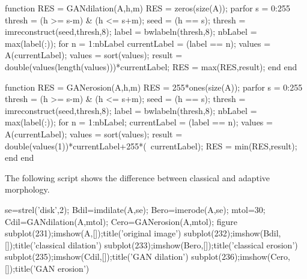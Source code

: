 \begin{matlab}
function RES = GANdilation(A,h,m)
RES = zeros(size(A));
parfor s = 0:255
    thresh = (h >= s-m) & (h <= s+m);
    seed = (h == s);
    thresh = imreconstruct(seed,thresh,8);
    label = bwlabeln(thresh,8);
    nbLabel = max(label(:));
    for n = 1:nbLabel
        currentLabel = (label == n);
        values = A(currentLabel);
        values = sort(values);
        result = double(values(length(values)))*currentLabel;
        RES = max(RES,result);  
    end
end
\end{matlab}

\begin{matlab}
function RES = GANerosion(A,h,m)
RES = 255*ones(size(A));
parfor s = 0:255
    thresh = (h >= s-m) & (h <= s+m);
    seed = (h == s);
    thresh = imreconstruct(seed,thresh,8);
    label = bwlabeln(thresh,8);
    nbLabel = max(label(:));
    for n = 1:nbLabel;
        currentLabel = (label == n);
        values = A(currentLabel);
        values = sort(values);
        result = double(values(1))*currentLabel+255*(~currentLabel);
        RES = min(RES,result);
    end
end
\end{matlab}

The following script shows the difference between classical and adaptive morphology.

\begin{matlab}
se=strel('disk',2);
Bdil=imdilate(A,se);
Bero=imerode(A,se);
mtol=30;
Cdil=GANdilation(A,mtol);
Cero=GANerosion(A,mtol);
figure
subplot(231);imshow(A,[]);title('original image')
subplot(232);imshow(Bdil,[]);title('classical dilation')
subplot(233);imshow(Bero,[]);title('classical erosion')
subplot(235);imshow(Cdil,[]);title('GAN dilation')
subplot(236);imshow(Cero,[]);title('GAN erosion')
\end{matlab}


